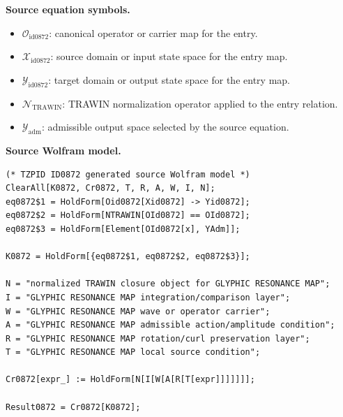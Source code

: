 \begin{minipage}[t]{0.49\linewidth}
\begingroup
\small
\raggedright
\textbf{Source equation symbols.}\par
\begin{itemize}[leftmargin=1.35em,itemsep=1pt,topsep=1pt,parsep=0pt]
    \item $\mathcal{O}_{\mathrm{id0872}}$: canonical operator or carrier map for the entry.
    \item $\mathcal{X}_{\mathrm{id0872}}$: source domain or input state space for the entry map.
    \item $\mathcal{Y}_{\mathrm{id0872}}$: target domain or output state space for the entry map.
    \item $\mathcal{N}_{\mathrm{TRAWIN}}$: TRAWIN normalization operator applied to the entry relation.
    \item $\mathcal{Y}_{\mathrm{adm}}$: admissible output space selected by the source equation.
\end{itemize}
\endgroup
\end{minipage}\hfill
\begin{minipage}[t]{0.47\linewidth}
\begingroup
\scriptsize
\raggedright
\textbf{Source Wolfram model.}\par
\begin{Verbatim}[fontsize=\tiny,breaklines=true,breakanywhere=true]
(* TZPID ID0872 generated source Wolfram model *)
ClearAll[K0872, Cr0872, T, R, A, W, I, N];
eq0872$1 = HoldForm[Oid0872[Xid0872] -> Yid0872];
eq0872$2 = HoldForm[NTRAWIN[OId0872] == OId0872];
eq0872$3 = HoldForm[Element[OId0872[x], YAdm]];

K0872 = HoldForm[{eq0872$1, eq0872$2, eq0872$3}];

N = "normalized TRAWIN closure object for GLYPHIC RESONANCE MAP";
I = "GLYPHIC RESONANCE MAP integration/comparison layer";
W = "GLYPHIC RESONANCE MAP wave or operator carrier";
A = "GLYPHIC RESONANCE MAP admissible action/amplitude condition";
R = "GLYPHIC RESONANCE MAP rotation/curl preservation layer";
T = "GLYPHIC RESONANCE MAP local source condition";

Cr0872[expr_] := HoldForm[N[I[W[A[R[T[expr]]]]]]];

Result0872 = Cr0872[K0872];
\end{Verbatim}
\endgroup
\end{minipage}

